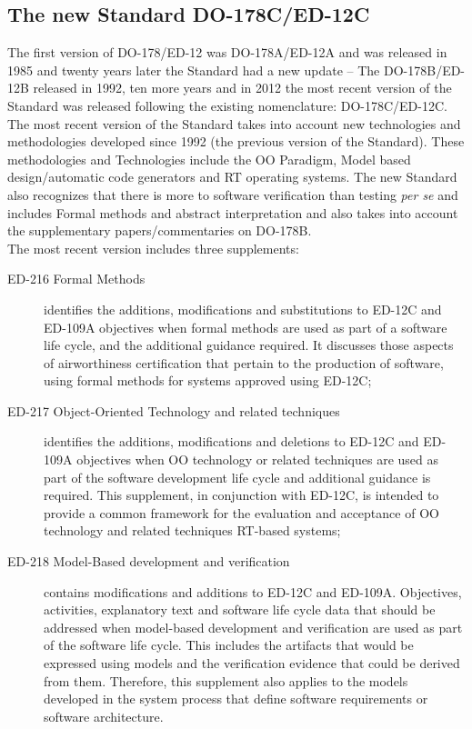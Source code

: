 {\subsection{The new Standard DO-178C/ED-12C}\label{sec:new-stand}
The first version of DO-178/ED-12 was DO-178A/ED-12A and was released in 1985 and twenty years later the Standard had a new update -- The DO-178B/ED-12B released in 1992,
ten more years and in 2012 the most recent version of the Standard was released following the existing nomenclature: DO-178C/ED-12C.
The most recent version of the Standard takes into account new technologies and methodologies developed since 1992 (the previous version of the Standard).
These methodologies and Technologies include the \ac{OO} Paradigm, Model based design/automatic code generators and \ac{RT} operating systems.
The new Standard also recognizes that there is more to software verification than testing \textit{per se} and includes Formal methods\cite{Brosgol:2011:DNA:2070337.2070341} and abstract interpretation
and also takes into account the supplementary papers/commentaries on DO-178B.\\
The most recent version includes three supplements: 
\begin{description}
\item[ED-216 Formal Methods] identifies the additions, modifications and substitutions to ED-12C and ED-109A objectives when formal methods are used as part of a software life cycle, and the additional guidance required. It discusses those aspects of airworthiness certification that pertain to the production of software, using formal methods for systems approved using ED-12C;
\item[ED-217 Object-Oriented Technology and related techniques] identifies the additions, modifications and deletions to ED-12C and ED-109A objectives 
when \ac{OO} technology or related techniques are used as part of the software development life cycle and additional guidance is required.
This supplement, in conjunction with ED-12C, is intended to provide a common framework for the evaluation and acceptance of \ac{OO} technology
and related techniques \ac{RT}-based systems;
\item[ED-218 Model-Based development and verification] contains modifications and additions to ED-12C and ED-109A. Objectives, activities, explanatory text and
software life cycle data that should be addressed when model-based development and verification are used as part of the software life cycle.
This includes the artifacts that would be expressed using models and the verification evidence that could be derived from them.
Therefore, this supplement also applies to the models developed in the system process that define software requirements or software architecture.
\end{description}

}
